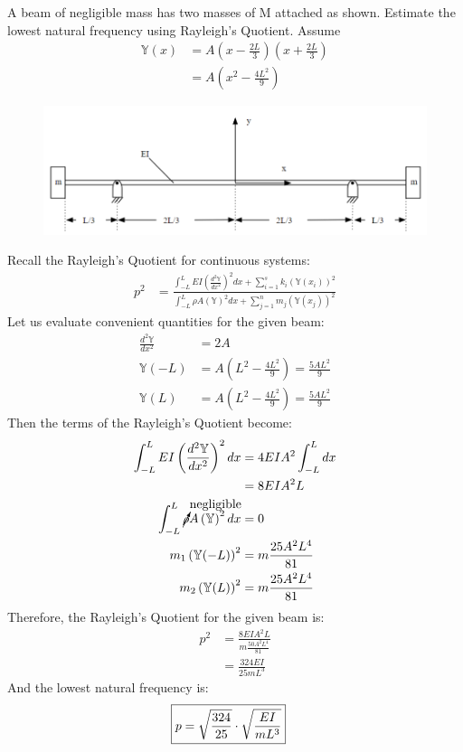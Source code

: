 \section{}
\subsection{}
{A beam of negligible mass has two masses of M attached as shown. Estimate the lowest natural frequency using Rayleigh's Quotient. Assume}
\begin{align*}
    \mathbb{Y}(x) &= A(x - \frac{2L}{3})(x + \frac{2L}{3}) \\
    &= A(x^2 - \frac{4L^2}{9})
\end{align*}
\begin{figure}[H]
    \centering
    \includegraphics[width=0.6\linewidth]{Questions/Figures/Q3 Problem Diagram.png}
\end{figure}
Recall the Rayleigh's Quotient for continuous systems:
\begin{align*}
    p^2 &= \displaystyle\frac{\displaystyle \int_{-L}^{L} EI \left(\frac{d^2 \mathbb{Y}}{dx^2}\right)^2 dx + \displaystyle\sum_{i = 1}^{s} k_i \left(\mathbb{Y}(x_i)\right)^2}{\displaystyle \int_{-L}^{L} \rho A \left(\mathbb{Y}\right)^2 dx + \displaystyle\sum_{j = 1}^{n} m_j \left(\mathbb{Y}(x_j)\right)^2}
\end{align*}
Let us evaluate convenient quantities for the given beam:
\begin{align*}
    \frac{d^2 \mathbb{Y}}{dx^2} &= 2A \\
    \mathbb{Y}(-L) &= A(L^2 - \frac{4L^2}{9}) = \frac{5AL^2}{9} \\
    \mathbb{Y}(L) &= A(L^2 - \frac{4L^2}{9}) = \frac{5AL^2}{9}
\end{align*}
Then the terms of the Rayleigh's Quotient become:
\begin{align*}
    \int_{-L}^{L} EI \left(\frac{d^2 \mathbb{Y}}{dx^2}\right)^2 dx &= 4EIA^2 \int_{-L}^{L} dx \\
    &= 8EIA^2 L \\
    \int_{-L}^{L} \cancelto{\text{negligible}}{\rho} A \left(\mathbb{Y}\right)^2 dx &= 0 \\
    m_{1} \left(\mathbb{Y}(-L)\right)^2 &= m \frac{25 A^2 L^4}{81} \\
    m_{2} \left(\mathbb{Y}(L)\right)^2 &= m \frac{25 A^2 L^4}{81} 
\end{align*}
Therefore, the Rayleigh's Quotient for the given beam is:
\begin{align*}
    p^2 &= \frac{8 EIA^2L}{m\frac{50 A^2 L^4}{81}} \\
    &= \frac{324 E I}{25 m L^3}
\end{align*}
And the lowest natural frequency is:
\begin{align*}
    \Aboxed{p &= \sqrt{\frac{324}{25}} \cdot \sqrt{\frac{E I}{m L^3}}} 
\end{align*}

